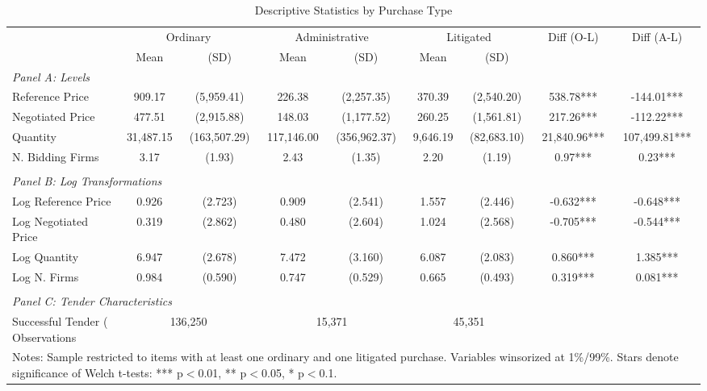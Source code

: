 \begin{table}[htbp]
\centering
\caption{Descriptive Statistics by Purchase Type}
\label{tab:desc_stats}
\small
\begin{tabular}{lcccccccc}
\hline\hline
 & \multicolumn{2}{c}{Ordinary} & \multicolumn{2}{c}{Administrative} & \multicolumn{2}{c}{Litigated} & Diff (O-L) & Diff (A-L) \\
 & Mean & (SD) & Mean & (SD) & Mean & (SD) & & \\
\hline
\multicolumn{9}{l}{\textit{Panel A: Levels}} \\[3pt]
  Reference Price & 909.17 & (5,959.41) & 226.38 & (2,257.35) & 370.39 & (2,540.20) & 538.78*** & -144.01*** \\
  Negotiated Price & 477.51 & (2,915.88) & 148.03 & (1,177.52) & 260.25 & (1,561.81) & 217.26*** & -112.22*** \\
  Quantity & 31,487.15 & (163,507.29) & 117,146.00 & (356,962.37) & 9,646.19 & (82,683.10) & 21,840.96*** & 107,499.81*** \\
  N. Bidding Firms & 3.17 & (1.93) & 2.43 & (1.35) & 2.20 & (1.19) & 0.97*** & 0.23*** \\
\\[3pt]
\multicolumn{9}{l}{\textit{Panel B: Log Transformations}} \\[3pt]
  Log Reference Price & 0.926 & (2.723) & 0.909 & (2.541) & 1.557 & (2.446) & -0.632*** & -0.648*** \\
  Log Negotiated Price & 0.319 & (2.862) & 0.480 & (2.604) & 1.024 & (2.568) & -0.705*** & -0.544*** \\
  Log Quantity & 6.947 & (2.678) & 7.472 & (3.160) & 6.087 & (2.083) & 0.860*** & 1.385*** \\
  Log N. Firms & 0.984 & (0.590) & 0.747 & (0.529) & 0.665 & (0.493) & 0.319*** & 0.081*** \\
\\[3pt]
\multicolumn{9}{l}{\textit{Panel C: Tender Characteristics}} \\[3pt]
  Successful Tender (%
\hline
  Observations & \multicolumn{2}{c}{136,250} & \multicolumn{2}{c}{15,371} & \multicolumn{2}{c}{45,351} & & \\
\hline\hline
\multicolumn{9}{p{0.95\textwidth}}{\footnotesize Notes: Sample restricted to items with at least one ordinary and one litigated purchase. Variables winsorized at 1\%/99\%. Stars denote significance of Welch t-tests: *** p$<$0.01, ** p$<$0.05, * p$<$0.1.} \\
\end{tabular}
\end{table}
